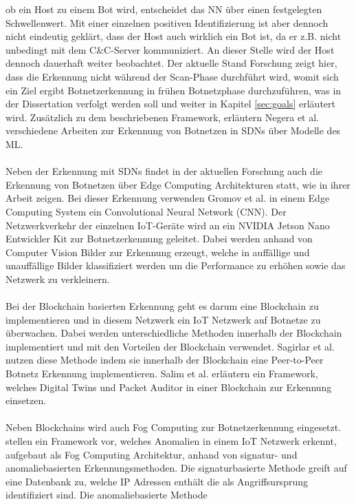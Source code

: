 ob ein Host zu einem Bot wird, entscheidet das NN über einen festgelegten Schwellenwert. Mit einer einzelnen positiven Identifizierung ist aber dennoch nicht eindeutig geklärt, dass der
Host auch wirklich ein Bot ist, da er z.B. nicht unbedingt mit dem C\&C-Server kommuniziert. An dieser Stelle wird der Host dennoch dauerhaft weiter beobachtet. Der aktuelle Stand Forschung 
zeigt hier, dass die Erkennung nicht während der Scan-Phase durchführt wird, womit sich ein Ziel ergibt Botnetzerkennung in frühen Botnetzphase durchzuführen, was in der Dissertation verfolgt 
werden soll und weiter in Kapitel \ref{sec:goals} erläutert wird. Zusätzlich zu dem beschriebenen Framework, erläutern Negera et al. \cite{DBLP:journals/sensors/NegeraSDMA22} verschiedene Arbeiten 
zur Erkennung von Botnetzen in SDNs über Modelle des ML. \\ \\ Neben der Erkennung mit SDNs findet in der aktuellen Forschung auch die Erkennung von Botnetzen über Edge Computing Architekturen 
statt, wie \cite{gromov2022edge} in ihrer Arbeit zeigen. Bei dieser Erkennung verwenden Gromov et al. in einem Edge Computing System ein Convolutional Neural Network (CNN). Der Netzwerkverkehr der 
einzelnen IoT-Geräte wird an ein NVIDIA Jetson Nano Entwickler Kit zur Botnetzerkennung geleitet. Dabei werden anhand von Computer Vision Bilder zur Erkennung erzeugt, welche in auffällige und 
unauffällige Bilder klassifiziert werden um die Performance zu erhöhen sowie das Netzwerk zu verkleinern. \\ \\ Bei der Blockchain basierten Erkennung geht es darum eine Blockchain zu implementieren 
und in diesem Netzwerk ein IoT Netzwerk auf Botnetze zu überwachen. Dabei werden unterschiedliche Methoden innerhalb der Blockchain implementiert und mit den Vorteilen der Blockchain verwendet. 
Sagirlar et al. \cite{DBLP:journals/corr/abs-1809-10775} nutzen diese Methode indem sie innerhalb der Blockchain eine Peer-to-Peer Botnetz Erkennung implementieren. Salim et al. 
\cite{DBLP:journals/sensors/SalimATPP22} erläutern ein Framework, welches Digital Twins und Packet Auditor in einer Blockchain zur Erkennung einsetzen. \\ \\ Neben Blockchains wird auch Fog 
Computing zur Botnetzerkennung eingesetzt. \cite{Lawal2020AnAM} stellen ein Framework vor, welches Anomalien in einem IoT Netzwerk erkennt, aufgebaut als Fog Computing Architektur, anhand von signatur- 
und anomaliebasierten Erkennungsmethoden. Die signaturbasierte Methode greift auf eine Datenbank zu, welche IP Adressen enthält die als Angriffsursprung identifiziert sind. Die anomaliebasierte Methode 
